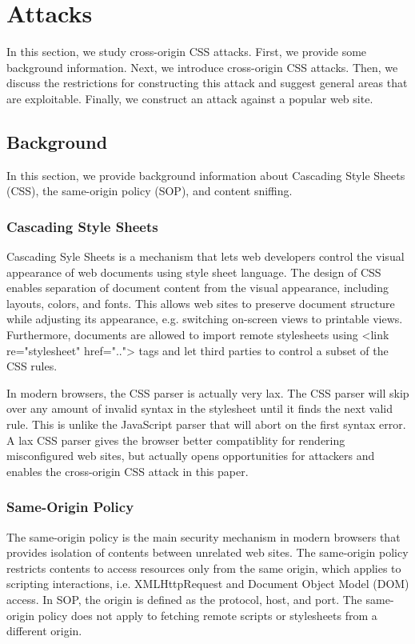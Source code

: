 \documentclass{acm_proc_article-sp}
\begin{document}
\section{Attacks}
In this section, we study cross-origin CSS attacks. First, we provide some background information. Next, we introduce cross-origin CSS attacks. Then, we discuss the restrictions for constructing this attack and suggest general areas that are exploitable. Finally, we construct an attack against a popular web site.

\subsection{Background}
In this section, we provide background information about Cascading Style Sheets (CSS), the same-origin policy (SOP), and content sniffing.

\subsubsection{Cascading Style Sheets}
Cascading Syle Sheets\cite{css} is a mechanism that lets web developers control the visual appearance of web documents using style sheet language. The design of CSS enables separation of document content from the visual appearance, including layouts, colors, and fonts. This allows web sites to preserve document structure while adjusting its appearance, e.g. switching on-screen views to printable views. Furthermore, documents are allowed to import remote stylesheets using <link re="stylesheet" href=".."> tags and let third parties to control a subset of the CSS rules.

In modern browsers, the CSS parser is actually very lax. The CSS parser will skip over any amount of invalid syntax in the stylesheet until it finds the next valid rule. This is unlike the JavaScript parser that will abort on the first syntax error. A lax CSS parser gives the browser better compatiblity for rendering misconfigured web sites, but actually opens opportunities for attackers and enables the cross-origin CSS attack in this paper.

\subsubsection{Same-Origin Policy}
The same-origin policy\cite{mozillasameorigin} is the main security mechanism in modern browsers that provides isolation of contents between unrelated web sites. The same-origin policy restricts contents to access resources only from the same origin, which applies to scripting interactions, i.e. XMLHttpRequest and Document Object Model (DOM)\cite{dom} access. In SOP, the origin is defined as the protocol, host, and port. The same-origin policy does not apply to fetching remote scripts or stylesheets from a different origin.
\end{document}
